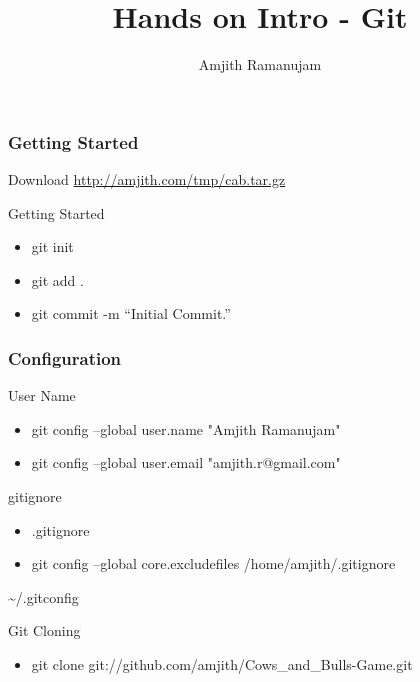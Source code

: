 \documentclass[10pt]{beamer}
\title{Hands on Intro - Git}
\author{Amjith Ramanujam}
\institute{twitter: amjith\_\\
blog: amjith.blogspot.com}
\date{}
\begin{document}
\begin{frame}
    \titlepage
\end{frame}

\begin{frame}
    \frametitle{Getting Started}
    Download \url{http://amjith.com/tmp/cab.tar.gz}
    \begin{block}{Getting Started}
        \begin{itemize}
            \item git init \\
            \item git add .\\
            \item git commit -m ``Initial Commit.''
        \end{itemize}
    \end{block}
\end{frame}

\begin{frame}
    \frametitle{Configuration}
    \begin{block}{User Name}
        \begin{itemize}
            \item git config --global user.name "Amjith Ramanujam"   \\
            \item git config --global user.email "amjith.r@gmail.com"\\
        \end{itemize}
    \end{block}
    \pause
    \begin{block}{gitignore}
        \begin{itemize}
            \item .gitignore\\
            \item git config --global core.excludefiles /home/amjith/.gitignore\\
        \end{itemize}
    \end{block}
    \textasciitilde/.gitconfig
    \pause
    \begin{block}{Git Cloning}
        \begin{itemize}
		\item git clone git://github.com/amjith/Cows\_and\_Bulls-Game.git
        \end{itemize}
    \end{block}
\end{frame}
\end{document}
